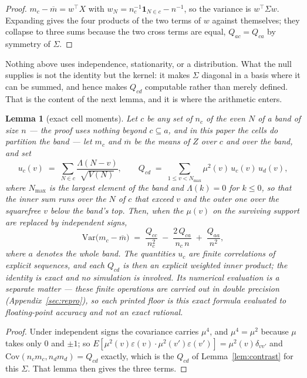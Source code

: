 \documentclass[11pt,a4paper]{article}
\theoremstyle{plain}
\newtheorem{lemma}[theorem]{Lemma}
\theoremstyle{definition}
\theoremstyle{remark}
\begin{document}
\begin{proof}
$m_c-\overline m=w^{\!\top}X$ with $w_N=n_c^{-1}\mathbf 1_{N\in c}-n^{-1}$,
so the variance is $w^{\!\top}\Sigma w$. Expanding gives the four
products of the two terms of $w$ against themselves; they collapse to
three sums because the two cross terms are equal, $Q_{ac}=Q_{ca}$ by
symmetry of $\Sigma$.
\end{proof}

Nothing above uses independence, stationarity, or a distribution. What
the null supplies is not the identity but the kernel: it makes $\Sigma$
diagonal in a basis where it can be summed, and hence makes $Q_{cd}$
computable rather than merely defined. That is the content of the next
lemma, and it is where the arithmetic enters.

\begin{lemma}[exact cell moments]\label{lem:cellmom}
Let $c$ be any set of $n_c$ of the even $N$ of a band of size $n$ ---
the proof uses nothing beyond $c\subseteq a$, and in this paper the
cells do partition the band --- let $m_c$ and $\overline m$ be
the means of $Z$ over $c$ and over the band, and set
\[
  u_c(v)\;=\;\sum_{N\in c}\frac{\Lambda(N-v)}{\sqrt{V(N)}},
  \qquad
  Q_{cd}\;=\;\sum_{1\le v<N_{\max}}\mu^2(v)\,u_c(v)\,u_d(v),
\]
where $N_{\max}$ is the largest element of the band and
$\Lambda(k)=0$ for $k\le0$, so that the inner sum runs over the $N$ of
$c$ that exceed $v$ and the outer one over the squarefree $v$ below the
band's top. Then, when the $\mu(v)$ on the surviving support are
replaced by independent signs,
\begin{equation}\label{eq:cellmom}
  \mathrm{Var}\bigl(m_c-\overline m\bigr)
  \;=\;\frac{Q_{cc}}{n_c^{2}}
  \;-\;\frac{2\,Q_{ca}}{n_c\,n}
  \;+\;\frac{Q_{aa}}{n^{2}},
\end{equation}
where $a$ denotes the whole band. The quantities $u_c$ are finite
correlations of explicit sequences, and each $Q_{cd}$ is then an
explicit weighted inner product; the identity is exact and no
simulation is involved. Its numerical evaluation is a separate matter
--- these finite operations are carried out in double precision
(Appendix~\ref{sec:repro}), so each printed floor is this exact formula
evaluated to floating-point accuracy and not an exact rational.
\end{lemma}

\begin{proof}
Under independent signs the covariance carries $\mu^4$, and $\mu^4=\mu^2$
because $\mu$ takes only $0$ and $\pm1$; so
$E[\mu^2(v)\varepsilon(v)\cdot\mu^2(v')\varepsilon(v')]
 =\mu^2(v)\delta_{vv'}$ and
$\mathrm{Cov}(n_cm_c,n_dm_d)=Q_{cd}$ exactly, which is the $Q_{cd}$ of
Lemma~\ref{lem:contrast} for this $\Sigma$. That lemma then gives the
three terms.
\end{proof}
\end{document}
